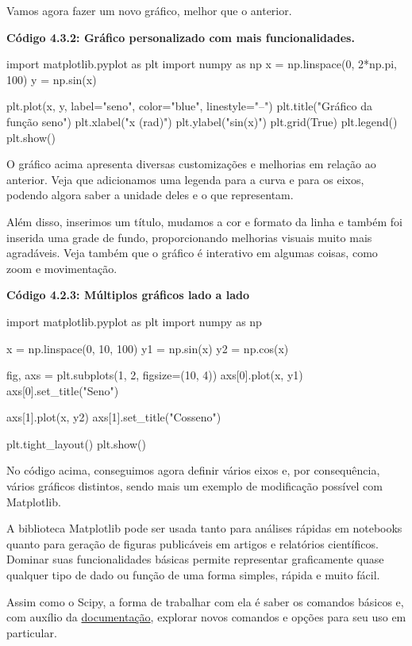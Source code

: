 \documentclass[11pt, a4paper]{article}
\begin{document}
Vamos agora fazer um novo gráfico, melhor que o anterior.

\textbf{Código 4.3.2: Gráfico personalizado com mais funcionalidades.}

\begin{code}
import matplotlib.pyplot as plt
import numpy as np
x = np.linspace(0, 2*np.pi, 100)
y = np.sin(x)

plt.plot(x, y, label="seno", color="blue", linestyle="--")
plt.title("Gráfico da função seno")
plt.xlabel("x (rad)")
plt.ylabel("sin(x)")
plt.grid(True)
plt.legend()
plt.show()
\end{code}

O gráfico acima apresenta diversas customizações e melhorias em relação ao anterior. Veja que adicionamos uma legenda para a curva e para os eixos, podendo algora saber a unidade deles e o que representam.

Além disso, inserimos um título, mudamos a cor e formato da linha e também foi inserida uma grade de fundo, proporcionando melhorias visuais muito mais agradáveis. Veja também que o gráfico é interativo em algumas coisas, como zoom e movimentação.

\textbf{Código 4.2.3: Múltiplos gráficos lado a lado}

\begin{code}
import matplotlib.pyplot as plt
import numpy as np

x = np.linspace(0, 10, 100)
y1 = np.sin(x)
y2 = np.cos(x)

fig, axs = plt.subplots(1, 2, figsize=(10, 4))
axs[0].plot(x, y1)
axs[0].set_title("Seno")

axs[1].plot(x, y2)
axs[1].set_title("Cosseno")

plt.tight_layout()
plt.show()
\end{code}

No código acima, conseguimos agora definir vários eixos e, por consequência, vários gráficos distintos, sendo mais um exemplo de modificação possível com Matplotlib.

A biblioteca Matplotlib pode ser usada tanto para análises rápidas em notebooks quanto para geração de figuras publicáveis em artigos e relatórios científicos. Dominar suas funcionalidades básicas permite representar graficamente quase qualquer tipo de dado ou função de uma forma simples, rápida e muito fácil.

Assim como o Scipy, a forma de trabalhar com ela é saber os comandos básicos e, com auxílio da \href{https://matplotlib.org/stable/index.html}{documentação}, explorar novos comandos e opções para seu uso em particular.
\end{document}
